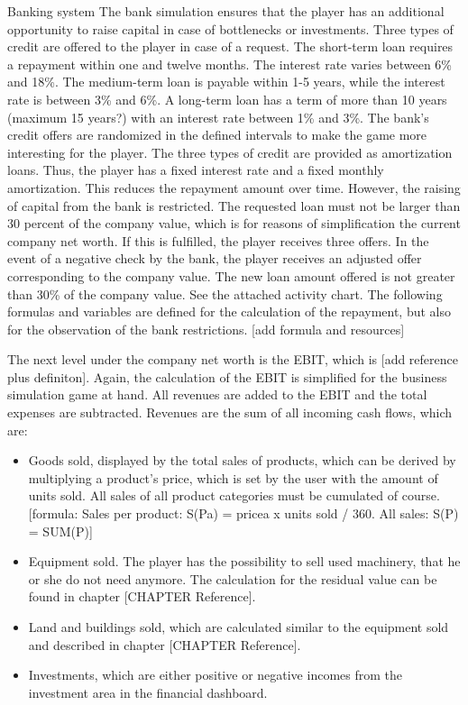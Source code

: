 Banking system
The bank simulation ensures that the player has an additional opportunity to raise capital in case of bottlenecks or investments. Three types of credit are offered to the player in case of a request. 
The short-term loan requires a repayment within one and twelve months. The interest rate varies between 6\% and 18\%. The medium-term loan is payable within 1-5 years, while the interest rate is between 3\% and 6\%. A long-term loan has a term of more than 10 years (maximum 15 years?) with an interest rate between 1\% and 3\%. The bank's credit offers are randomized in the defined intervals to make the game more interesting for the player. The three types of credit are provided as amortization loans. Thus, the player has a fixed interest rate and a fixed monthly amortization. This reduces the repayment amount over time.
However, the raising of capital from the bank is restricted.
The requested loan must not be larger than 30 percent of the company value, which is for reasons of simplification the current company net worth. If this is fulfilled, the player receives three offers. In the event of a negative check by the bank, the player receives an adjusted offer corresponding to the company value. The new loan amount offered is not greater than 30\% of the company value. See the attached activity chart. 
The following formulas and variables are defined for the calculation of the repayment, but also for the observation of the bank restrictions. [add formula and resources]

The next level under the company net worth is the EBIT, which is [add reference plus definiton]. Again, the calculation of the EBIT is simplified for the business simulation game at hand. All revenues are added to the EBIT and the total expenses are subtracted. Revenues are the sum of all incoming cash flows, which are:
\begin{itemize}
    \item Goods sold, displayed by the total sales of products, which can be derived by multiplying a product’s price, which is set by the user with the amount of units sold. All sales of all product categories must be cumulated of course. [formula: 
Sales per product: S(Pa) = pricea x units sold / 360. 
All sales: S(P) = SUM(P)]
    \item Equipment sold. The player has the possibility to sell used machinery, that he or she do not need anymore. The calculation for the residual value can be found in chapter [CHAPTER Reference].
    \item Land and buildings sold, which are calculated similar to the equipment sold and described in chapter [CHAPTER Reference].
    \item Investments, which are either positive or negative incomes from the investment area in the financial dashboard.
\end{itemize}

